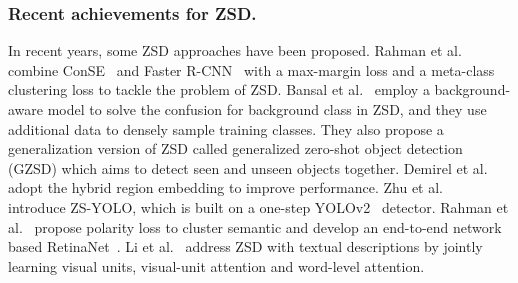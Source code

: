 \documentclass[runningheads]{llncs}
\begin{document}
\subsubsection{Recent achievements for ZSD.}
In recent years, some ZSD approaches have been proposed. Rahman et al.~\cite{rahman2018zero} combine ConSE~\cite{norouzi2013zero} and Faster R-CNN~\cite{fasterrcnn} with a max-margin loss and a meta-class clustering loss to tackle the problem of ZSD. Bansal et al.~\cite{bansal2018zero} employ a background-aware model to solve the confusion for background class in ZSD, and they use additional data to densely sample training classes. They also propose a generalization version of ZSD called generalized zero-shot object detection (GZSD) which aims to detect seen and unseen objects together. Demirel et al.~\cite{demirel2018zero} adopt the hybrid region embedding to improve performance. Zhu et al.~\cite{zhu2019zero} introduce ZS-YOLO, which is built on a one-step YOLOv2~\cite{redmon2017yolo9000} detector. Rahman et al.~\cite{rahman2020improved} propose polarity loss to cluster semantic and develop an end-to-end network based RetinaNet~\cite{retinaNet}. Li et al.~\cite{li2019zero} address ZSD with textual descriptions by jointly learning visual units, visual-unit attention and word-level attention. 
\end{document}
